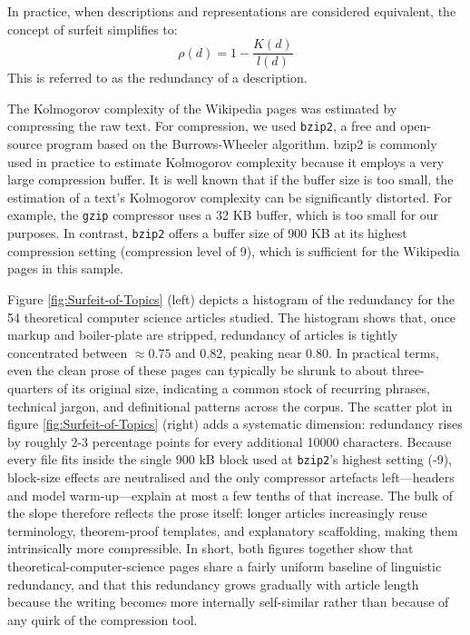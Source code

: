 In practice, when descriptions and representations are considered equivalent, the concept of surfeit simplifies to:
\[
\rho(d) = 1 - \frac{K(d)}{l(d)}
\]
This is referred to as the redundancy of a description.

The Kolmogorov complexity of the Wikipedia pages was estimated by compressing the raw text. For compression, we used \texttt{bzip2}, a free and open-source program based on the Burrows-Wheeler algorithm. bzip2 is commonly used in practice to estimate Kolmogorov complexity because it employs a very large compression buffer. It is well known that if the buffer size is too small, the estimation of a text's Kolmogorov complexity can be significantly distorted. For example, the \texttt{gzip} compressor uses a 32 KB buffer, which is too small for our purposes. In contrast, \texttt{bzip2} offers a buffer size of 900 KB at its highest compression setting (compression level of 9), which is sufficient for the Wikipedia pages in this sample.

Figure \ref{fig:Surfeit-of-Topics} (left) depicts a histogram of the redundancy for the 54 theoretical computer science articles studied. The histogram shows that, once markup and boiler-plate are stripped, redundancy of articles is tightly concentrated between $\approx 0.75$ and $0.82$, peaking near $0.80$. In practical terms, even the clean prose of these pages can typically be shrunk to about three-quarters of its original size, indicating a common stock of recurring phrases, technical jargon, and definitional patterns across the corpus. The scatter plot in figure \ref{fig:Surfeit-of-Topics} (right) adds a systematic dimension: redundancy rises by roughly 2-3 percentage points for every additional 10000 characters. Because every file fits inside the single 900 kB block used at \texttt{bzip2}'s highest setting (-9), block-size effects are neutralised and the only compressor artefacts left—headers and model warm-up—explain at most a few tenths of that increase. The bulk of the slope therefore reflects the prose itself: longer articles increasingly reuse terminology, theorem-proof templates, and explanatory scaffolding, making them intrinsically more compressible. In short, both figures together show that theoretical-computer-science pages share a fairly uniform baseline of linguistic redundancy, and that this redundancy grows gradually with article length because the writing becomes more internally self-similar rather than because of any quirk of the compression tool.

